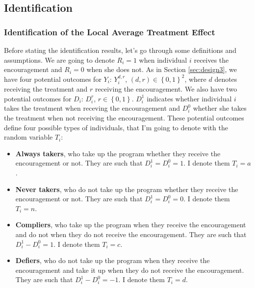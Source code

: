 \documentclass[]{book}
\providecommand{\tightlist}{%
  \setlength{\itemsep}{0pt}\setlength{\parskip}{0pt}}
\theoremstyle{definition}
\theoremstyle{definition}
\theoremstyle{definition}
\theoremstyle{remark}
\begin{document}
\hypertarget{identification-3}{%
\subsection{Identification}\label{identification-3}}

\hypertarget{identification-of-the-local-average-treatment-effect}{%
\subsubsection{Identification of the Local Average Treatment Effect}\label{identification-of-the-local-average-treatment-effect}}

Before stating the identification results, let's go through some definitions and assumptions.
We are going to denote \(R_i=1\) when individual \(i\) receives the encouragement and \(R_i=0\) when she does not.
As in Section \ref{sec:design3}, we have four potential outcomes for \(Y_i\): \(Y_i^{d,r}\), \((d,r)\in\left\{0,1\right\}^2\), where \(d\) denotes receiving the treatment and \(r\) receiving the encouragement.
We also have two potential outcomes for \(D_i\): \(D_i^{r}\), \(r\in\left\{0,1\right\}\).
\(D_i^{1}\) indicates whether individual \(i\) takes the treatment when receving the encouragement and \(D_i^{0}\) whether she takes the treatment when not receiving the encouragement.
These potential outcomes define four possible types of individuals, that I'm going to denote with the random variable \(T_i\):

\begin{itemize}
\tightlist
\item
  \textbf{Always takers}, who take up the program whether they receive the encouragement or not.
  They are such that \(D_i^{1}=D_i^{0}=1\).
  I denote them \(T_i=a\).
\item
  \textbf{Never takers}, who do not take up the program whether they receive the encouragement or not.
  They are such that \(D_i^{1}=D_i^{0}=0\).
  I denote them \(T_i=n\).
\item
  \textbf{Compliers}, who take up the program when they receive the encouragement and do not when they do not receive the encouragement.
  They are such that \(D_i^{1}-D_i^{0}=1\).
  I denote them \(T_i=c\).
\item
  \textbf{Defiers}, who do not take up the program when they receive the encouragement and take it up when they do not receive the encouragement.
  They are such that \(D_i^{1}-D_i^{0}=-1\).
  I denote them \(T_i=d\).
\end{itemize}
\end{document}
